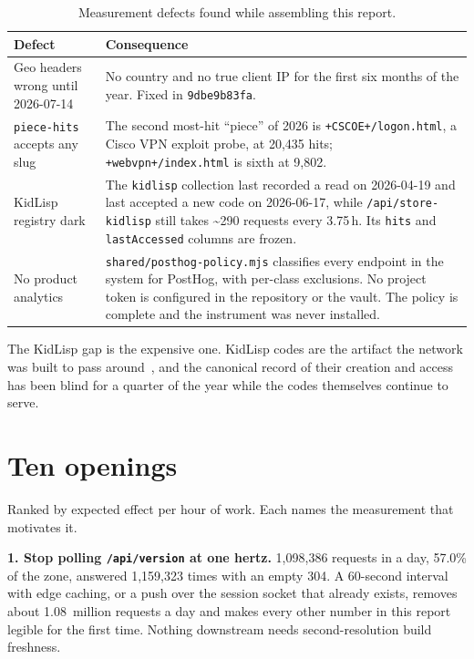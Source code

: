 \documentclass[10pt,letterpaper,twocolumn]{article}
\begin{document}
\begin{table}[t]
\centering
\footnotesize
\caption{Measurement defects found while assembling this report.}
\label{tab:faults}
\begin{tabularx}{\columnwidth}{@{}>{\raggedright\arraybackslash}p{}>{\raggedright\arraybackslash}X@{}}
\toprule
\textbf{Defect} & \textbf{Consequence} \\
\midrule
Geo headers wrong until 2026-07-14 & No country and no true client IP for the first six months of the year. Fixed in \texttt{9dbe9b83fa}. \\
\addlinespace
\texttt{piece-hits} accepts any slug & The second most-hit ``piece'' of 2026 is \texttt{+CSCOE+/logon.html}, a Cisco VPN exploit probe, at 20,435 hits; \texttt{+webvpn+/index.html} is sixth at 9,802. \\
\addlinespace
KidLisp registry dark & The \texttt{kidlisp} collection last recorded a read on 2026-04-19 and last accepted a new code on 2026-06-17, while \texttt{/api/store-kidlisp} still takes \textasciitilde290 requests every 3.75\,h. Its \texttt{hits} and \texttt{lastAccessed} columns are frozen. \\
\addlinespace
No product analytics & \texttt{shared/posthog-policy.mjs} classifies every endpoint in the system for PostHog, with per-class exclusions. No project token is configured in the repository or the vault. The policy is complete and the instrument was never installed. \\
\bottomrule
\end{tabularx}
\end{table}

The KidLisp gap is the expensive one. KidLisp codes are the artifact
the network was built to pass around~\citep{scudder2026kidlisp}, and
the canonical record of their creation and access has been blind for a
quarter of the year while the codes themselves continue to serve.

\section{Ten openings}
\label{sec:openings}

Ranked by expected effect per hour of work. Each names the measurement
that motivates it.

\textbf{1. Stop polling \texttt{/api/version} at one hertz.}
1,098,386 requests in a day, 57.0\% of the zone, answered 1,159,323
times with an empty 304. A 60-second interval with edge caching, or a
push over the session socket that already exists, removes about
1.08~million requests a day and makes every other number in this report
legible for the first time. Nothing downstream needs second-resolution
build freshness.
\end{document}

